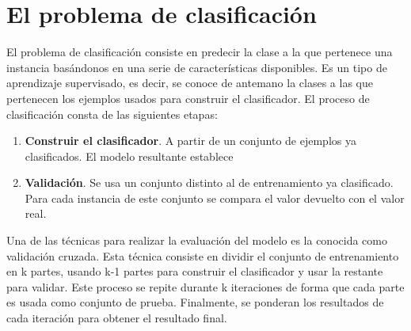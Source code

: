 \chapter{El problema de clasificación}\label{aped.F}

El problema de clasificación consiste en predecir la clase a la que pertenece una instancia basándonos en una serie de características disponibles. Es un tipo de aprendizaje supervisado, es decir, se conoce de antemano la clases a las que pertenecen los ejemplos usados para construir el clasificador.
El proceso de clasificación consta de las siguientes etapas:

\begin{enumerate}
	\item \textbf{Construir el clasificador}. A partir de un conjunto de ejemplos ya clasificados. El modelo resultante establece 
	\item \textbf{Validación}. Se usa un conjunto distinto al de entrenamiento ya clasificado. Para cada instancia de este conjunto se compara el valor devuelto con el valor real.
\end{enumerate}

Una de las técnicas para realizar la evaluación del modelo es la conocida como validación cruzada. Esta técnica consiste en dividir el conjunto de entrenamiento en k partes, usando k-1 partes para construir el clasificador y usar la restante para validar. Este proceso se repite durante k iteraciones de forma que cada parte es usada como conjunto de prueba. Finalmente, se ponderan los resultados de cada iteración para obtener el resultado final.

